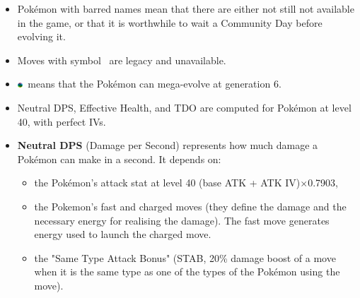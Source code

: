 \documentclass[12pt]{beamer}
\newcommand{\megaevol}{\includegraphics[width=0.2cm]{../../images/megaevolve}}
\begin{document}
\begin{frame}
\begin{block}{}
\begin{footnotesize}
\begin{itemize}
  \item Pok\'emon with barred names mean that there are either not still not available in the game, or that it is worthwhile to wait a Community Day before evolving it.
  \item Moves with symbol \dag~are legacy and unavailable.
  \item \megaevol~means that the Pok\'emon can mega-evolve at generation 6.
  \item Neutral DPS, Effective Health, and TDO are computed for Pok\'emon at level 40, with perfect IVs. 
  \item \textbf{Neutral DPS} (Damage per Second) represents how much damage a Pok\'emon can make in a second. It depends on:
  \begin{itemize}
  \item \footnotesize the Pok\'emon's attack stat at level 40 (base ATK + ATK IV)$\times$0.7903, 
  \item \footnotesize the Pokemon's fast and charged moves (they define the damage and the necessary energy for realising the damage). The fast move generates energy used to launch the charged move.
  \item \footnotesize the "Same Type Attack Bonus" (STAB, 20\% damage boost of a move when it is the same type as one of the types of the Pokémon using the move). 
\end{itemize}

\begin{center}



\end{center}
\end{itemize}
\end{footnotesize}
\end{block}
\end{frame}
\end{document}
